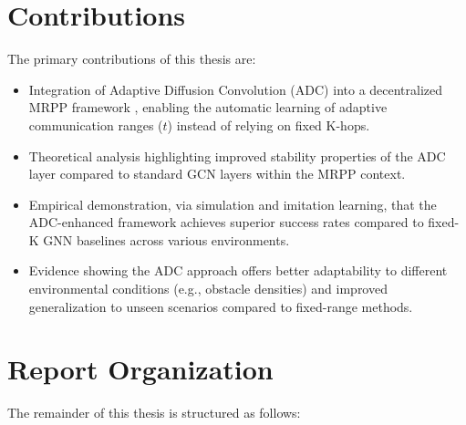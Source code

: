 \newpage

\section{Contributions}
\label{sec:contributions}

The primary contributions of this thesis are:
\begin{itemize}
    \item Integration of Adaptive Diffusion Convolution (ADC) \cite{Zhao2021ADC} into a decentralized MRPP framework \cite{Li2021GNNCoordination}, enabling the automatic learning of adaptive communication ranges ($t$) instead of relying on fixed K-hops.
    \item Theoretical analysis highlighting improved stability properties of the ADC layer compared to standard GCN layers within the MRPP context.
    \item Empirical demonstration, via simulation and imitation learning, that the ADC-enhanced framework achieves superior success rates compared to fixed-K GNN baselines across various environments.
    \item Evidence showing the ADC approach offers better adaptability to different environmental conditions (e.g., obstacle densities) and improved generalization to unseen scenarios compared to fixed-range methods.
\end{itemize}

\section{Report Organization}
\label{sec:report_organization}

The remainder of this thesis is structured as follows:

